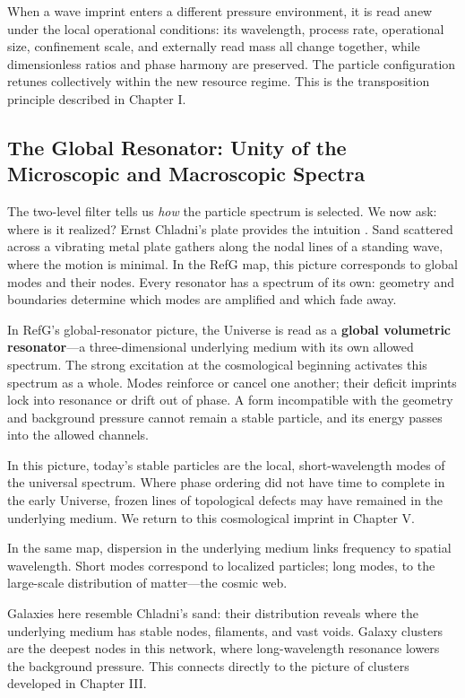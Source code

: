 \documentclass[11pt,a4paper]{article}
\begin{document}
When a wave imprint enters a different pressure environment, it is read anew under the local operational conditions: its wavelength, process rate, operational size, confinement scale, and externally read mass all change together, while dimensionless ratios and phase harmony are preserved. The particle configuration retunes collectively within the new resource regime. This is the transposition principle described in Chapter I.

\subsection{The Global Resonator: Unity of the Microscopic and Macroscopic Spectra}

The two-level filter tells us \emph{how} the particle spectrum is selected. We now ask: where is it realized? Ernst Chladni's plate provides the intuition \citep{chladni1787}. Sand scattered across a vibrating metal plate gathers along the nodal lines of a standing wave, where the motion is minimal. In the RefG map, this picture corresponds to global modes and their nodes. Every resonator has a spectrum of its own: geometry and boundaries determine which modes are amplified and which fade away.

In RefG's global-resonator picture, the Universe is read as a \textbf{global volumetric resonator}---a three-dimensional underlying medium with its own allowed spectrum. The strong excitation at the cosmological beginning activates this spectrum as a whole. Modes reinforce or cancel one another; their deficit imprints lock into resonance or drift out of phase. A form incompatible with the geometry and background pressure cannot remain a stable particle, and its energy passes into the allowed channels.

In this picture, today's stable particles are the local, short-wavelength modes of the universal spectrum. Where phase ordering did not have time to complete in the early Universe, frozen lines of topological defects may have remained in the underlying medium. We return to this cosmological imprint in Chapter V.

In the same map, dispersion in the underlying medium links frequency to spatial wavelength. Short modes correspond to localized particles; long modes, to the large-scale distribution of matter---the cosmic web.

Galaxies here resemble Chladni's sand: their distribution reveals where the underlying medium has stable nodes, filaments, and vast voids. Galaxy clusters are the deepest nodes in this network, where long-wavelength resonance lowers the background pressure. This connects directly to the picture of clusters developed in Chapter III.
\end{document}
